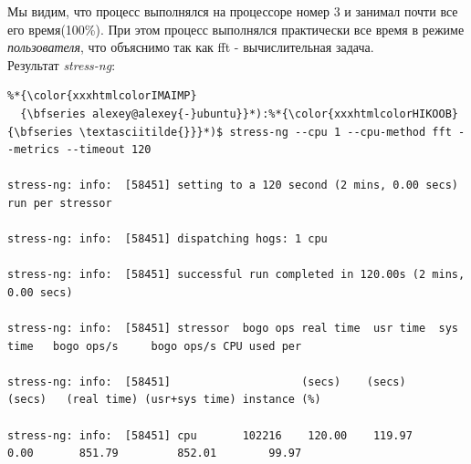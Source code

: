 Мы видим, что процесс выполнялся на процессоре номер 3 и занимал почти все его время(100\%).
При этом процесс выполнялся практически все время в режиме \textit{пользователя}, что объяснимо так как fft - вычислительная задача.\\
Результат \textit{stress-ng}:
\lstconsolestyle
{}
\begin{lstlisting}
%*{\color{xxxhtmlcolorIMAIMP}
  {\bfseries alexey@alexey{-}ubuntu}}*):%*{\color{xxxhtmlcolorHIKOOB}{\bfseries \textasciitilde{}}}*)$ stress-ng --cpu 1 --cpu-method fft --metrics --timeout 120

stress-ng: info:  [58451] setting to a 120 second (2 mins, 0.00 secs) run per stressor

stress-ng: info:  [58451] dispatching hogs: 1 cpu

stress-ng: info:  [58451] successful run completed in 120.00s (2 mins, 0.00 secs)

stress-ng: info:  [58451] stressor  bogo ops real time  usr time  sys time   bogo ops/s     bogo ops/s CPU used per

stress-ng: info:  [58451]                    (secs)    (secs)    (secs)   (real time) (usr+sys time) instance (%)

stress-ng: info:  [58451] cpu       102216    120.00    119.97      0.00       851.79         852.01        99.97
\end{lstlisting}

